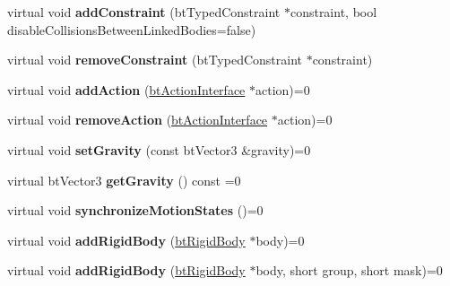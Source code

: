 \begin{DoxyCompactItemize}
\item 
\mbox{\label{classbtDynamicsWorld_aafdfed3d693792d9280251ff8b9ae0d8}} 
virtual void {\bfseries add\+Constraint} (bt\+Typed\+Constraint $\ast$constraint, bool disable\+Collisions\+Between\+Linked\+Bodies=false)
\item 
\mbox{\label{classbtDynamicsWorld_a89e0f17523fc4d65428545644f7e2515}} 
virtual void {\bfseries remove\+Constraint} (bt\+Typed\+Constraint $\ast$constraint)
\item 
\mbox{\label{classbtDynamicsWorld_ad8eea68a1bcbe55e6520aa3dee44a519}} 
virtual void {\bfseries add\+Action} (\hyperlink{classbtActionInterface}{bt\+Action\+Interface} $\ast$action)=0
\item 
\mbox{\label{classbtDynamicsWorld_a391b665d8ceae4d793fa213c87b5461f}} 
virtual void {\bfseries remove\+Action} (\hyperlink{classbtActionInterface}{bt\+Action\+Interface} $\ast$action)=0
\item 
\mbox{\label{classbtDynamicsWorld_aee63562f8067022cca1b4999057c4373}} 
virtual void {\bfseries set\+Gravity} (const bt\+Vector3 \&gravity)=0
\item 
\mbox{\label{classbtDynamicsWorld_a2a1de7e4e5456428d4558be6f24723ef}} 
virtual bt\+Vector3 {\bfseries get\+Gravity} () const =0
\item 
\mbox{\label{classbtDynamicsWorld_aed92a7b6bc477b60d50988a048eaa5a6}} 
virtual void {\bfseries synchronize\+Motion\+States} ()=0
\item 
\mbox{\label{classbtDynamicsWorld_a8d8f03c04ba63f525e09cb95452687f0}} 
virtual void {\bfseries add\+Rigid\+Body} (\hyperlink{classbtRigidBody}{bt\+Rigid\+Body} $\ast$body)=0
\item 
\mbox{\label{classbtDynamicsWorld_ac516f56dd52fc5d5575bb863ead1ad04}} 
virtual void {\bfseries add\+Rigid\+Body} (\hyperlink{classbtRigidBody}{bt\+Rigid\+Body} $\ast$body, short group, short mask)=0
\item 
\mbox{\label{classbtDynamicsWorld_a06ac55453d839d0a6cbc9c53e5537f73}} 

\end{DoxyCompactItemize}

